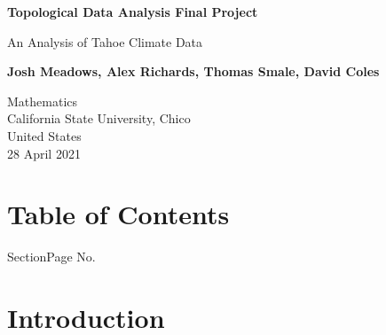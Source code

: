 \documentclass[12pt]{report}
\begin{document}
\begin{titlepage}
   \begin{center}
       \vspace*{1cm}

       \textbf{Topological Data Analysis Final Project}

       \vspace{0.5cm}
        An Analysis of Tahoe Climate Data
            
       \vspace{1.5cm}

       \textbf{Josh Meadows, Alex Richards, Thomas Smale, David Coles}

       \vfill
            
       
            
       \vspace{0.8cm}
            
       Mathematics\\
       California State University, Chico\\
       United States\\
       28 April 2021
            
   \end{center}
\end{titlepage}

\section*{Table of Contents}

\begin{bfseries}{Section}\hfill Page No.\vspace \bigskipamount \par 
{}
\end{bfseries}

\clearpage
\section*{Introduction}
\end{document}
